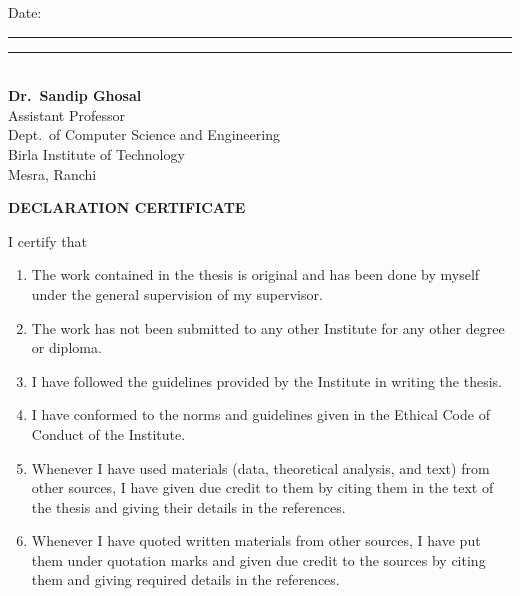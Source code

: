 \documentclass[a4paper,12pt]{report}
\newcommand{\guidename}{Dr.\ Sandip Ghosal}
\newcommand{\guidedesignation}{Assistant Professor}
\begin{document}
    \noindent Date: \rule{3.8cm}{0.9pt}

    \vspace{0.9cm}

    \noindent\hfill
    \begin{minipage}[t]{7.6cm}
        \raggedright
        \rule{\linewidth}{0.9pt}\\[0.15cm]
        \textbf{\guidename}\\
        \guidedesignation\\
        Dept.\ of Computer Science and Engineering\\
        Birla Institute of Technology\\
        Mesra, Ranchi
    \end{minipage}
\endgroup

\clearpage
\thispagestyle{empty}
\begingroup
    \fontsize{12}{16}\selectfont

    \vspace*{0.8cm}
    \begin{center}
        {\fontsize{16}{22}\selectfont \textbf{DECLARATION CERTIFICATE}\par}
    \end{center}

    \vspace{1.2cm}

    \noindent I certify that

    \vspace{0.1cm}

    \begin{enumerate}[label=\alph*), leftmargin=1.1cm, itemsep=0.5em, labelsep=0.4em]
        \item The work contained in the thesis is original and has been done by myself under the general supervision of my supervisor.
        \item The work has not been submitted to any other Institute for any other degree or diploma.
        \item I have followed the guidelines provided by the Institute in writing the thesis.
        \item I have conformed to the norms and guidelines given in the Ethical Code of Conduct of the Institute.
        \item Whenever I have used materials (data, theoretical analysis, and text) from other sources, I have given due credit to them by citing them in the text of the thesis and giving their details in the references.
        \item Whenever I have quoted written materials from other sources, I have put them under quotation marks and given due credit to the sources by citing them and giving required details in the references.
    \end{enumerate}
\end{document}
